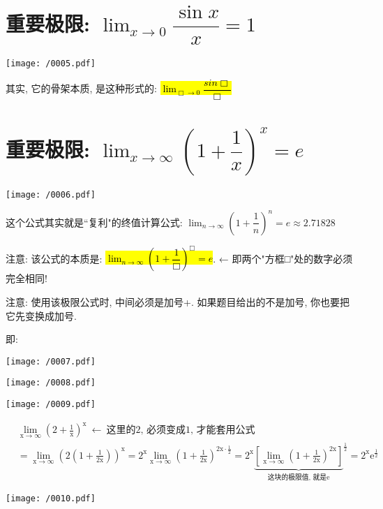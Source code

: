 \documentclass[UTF8]{ctexart}
\begin{document}
\section{ 重要极限: $\boxed{\lim_{x \to 0} \dfrac{\sin x} {x} = 1} $}

\texttt{[image: /0005.pdf]}

其实, 它的骨架本质, 是这种形式的: \hl{$\lim_{\Box \to 0} \dfrac{sin \Box} {\Box}$}




\section{重要极限: $ \boxed{\lim_{x \to \infty} (1+ \dfrac{1} {x})^x = e} $}

\texttt{[image: /0006.pdf]}

这个公式其实就是``复利"的终值计算公式: $ \lim_{n \to \infty} (1+ \dfrac{1} {n})^n = e \approx 2.71828 $

注意: 该公式的本质是: \hl{$\lim_{n \to \infty} (1+ \dfrac{1} {\Box})^\Box = e$}.  ← 即两个"方框□"处的数字必须完全相同!

注意: 使用该极限公式时, 中间必须是加号+. 如果题目给出的不是加号, 你也要把它先变换成加号.
	
即: 

\texttt{[image: /0007.pdf]}




\begin{tcolorbox}[title = {例},boxrule={0.1em},colframe={black!10}, colback={black!3},colbacktitle={black!10},coltitle={black}]
\texttt{[image: /0008.pdf]}

\texttt{[image: /0009.pdf]}
\end{tcolorbox}



\begin{tcolorbox}[title = {例},boxrule={0.1em},colframe={black!10}, colback={black!3},colbacktitle={black!10},coltitle={black}]
	\begin{align*}  %
		&\lim_{\text{x}\rightarrow \infty}\left( 2+\frac{1}{\text{x}} \right) ^{\text{x}}\ \gets \ \text{这里的2,\ 必须变成1,\ 才能套用公式}\\
	&=\lim_{\text{x}\rightarrow \infty}\left( 2\left( 1+\frac{1}{2\text{x}} \right) \right) ^{\text{x}}=2^{\text{x}}\lim_{\text{x}\rightarrow \infty}\left( 1+\frac{1}{2\text{x}} \right) ^{2\text{x}\cdot \frac{1}{2}}=2^{\text{x}}\underset{\text{这块的极限值,\ 就是e}}{\underbrace{\left[ \lim_{\text{x}\rightarrow \infty}\left( 1+\frac{1}{2\text{x}} \right) ^{2\text{x}} \right] }}^{\frac{1}{2}}=2^{\text{x}}\text{e}^{\frac{1}{2}}
	\end{align*}

\texttt{[image: /0010.pdf]}
\end{tcolorbox}
\end{document}
